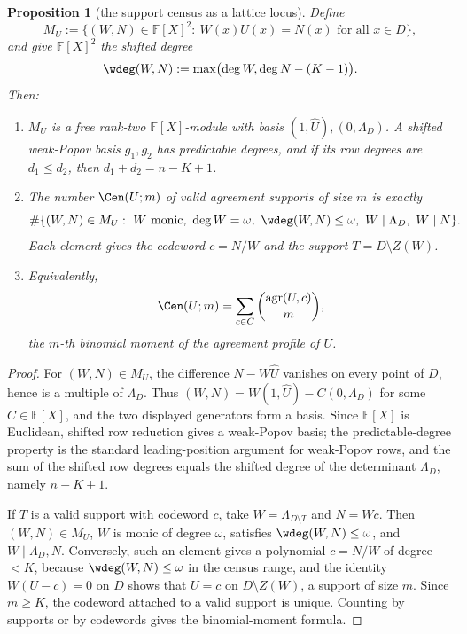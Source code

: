 \documentclass[11pt]{article}
\newtheorem{proposition}[proposition]{Proposition}
\theoremstyle{definition}
\theoremstyle{remark}
\newcommand{\F}{\mathbb{F}}
\begin{document}
\begin{proposition}[the support census as a lattice locus]\label{prop:capfr1-lattice-census}
Define
\[
        M_U:=\{(W,N)\in\F[X]^2:\ W(x)U(x)=N(x)\text{ for all }x\in D\},
\]
and give \(\F[X]^2\) the shifted degree
\[
        \wdeg(W,N):=\max\bigl(\deg W,\deg N-(K-1)\bigr).
\]
Then:
\begin{enumerate}[label=\textup{(\alph*)}]
\item \(M_U\) is a free rank-two \(\F[X]\)-module with basis \((1,\widehat U),(0,\Lambda_D)\).  A shifted weak-Popov basis \(g_1,g_2\) has predictable degrees, and if its row degrees are \(d_1\le d_2\), then \(d_1+d_2=n-K+1\).
\item The number \(\Cen(U;m)\) of valid agreement supports of size \(m\) is exactly
\[
        \#\{(W,N)\in M_U:\ W\text{ monic},\ \deg W=\omega,\ \wdeg(W,N)\le\omega,\ W\mid\Lambda_D,\ W\mid N\}.
\]
Each element gives the codeword \(c=N/W\) and the support \(T=D\setminus Z(W)\).
\item Equivalently,
\[
        \Cen(U;m)=\sum_{c\in C}\binom{\operatorname{agr}(U,c)}{m},
\]
the \(m\)-th binomial moment of the agreement profile of \(U\).
\end{enumerate}
\end{proposition}

\begin{proof}
For \((W,N)\in M_U\), the difference \(N-W\widehat U\) vanishes on every point of \(D\), hence is a multiple of \(\Lambda_D\).  Thus \((W,N)=W(1,\widehat U)-C(0,\Lambda_D)\) for some \(C\in\F[X]\), and the two displayed generators form a basis.  Since \(\F[X]\) is Euclidean, shifted row reduction gives a weak-Popov basis; the predictable-degree property is the standard leading-position argument for weak-Popov rows, and the sum of the shifted row degrees equals the shifted degree of the determinant \(\Lambda_D\), namely \(n-K+1\).

If \(T\) is a valid support with codeword \(c\), take \(W=\Lambda_{D\setminus T}\) and \(N=Wc\).  Then \((W,N)\in M_U\), \(W\) is monic of degree \(\omega\), satisfies \(\wdeg(W,N)\le\omega\), and \(W\mid\Lambda_D,N\).  Conversely, such an element gives a polynomial \(c=N/W\) of degree \(<K\), because \(\wdeg(W,N)\le\omega\) in the census range, and the identity \(W(U-c)=0\) on \(D\) shows that \(U=c\) on \(D\setminus Z(W)\), a support of size \(m\).  Since \(m\ge K\), the codeword attached to a valid support is unique.  Counting by supports or by codewords gives the binomial-moment formula.
\end{proof}
\end{document}
